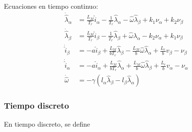 \documentclass{article}
\begin{document}
            Ecuaciones en tiempo continuo:
            \begin{align*}
               \dot{\hat{\lambda}}_\alpha &=  \frac{L_M}{T_r} \hat{i}_\alpha 
                    - \frac{1}{T_r} \hat{\lambda}_\alpha  
                    - \hat{\omega} \hat{\lambda}_\beta 
                    + k_1\nu_\alpha + k_2\nu_\beta  \\
                \dot{\hat{\lambda}}_\beta &=  \frac{L_M}{T_r} \hat{i}_\beta 
                    - \frac{1}{T_r} \hat{\lambda}_\beta  
                    + \hat{\omega} \hat{\lambda}_\alpha 
                    - k_2\nu_\alpha + k_1\nu_\beta  \\
                \dot{\hat{i}}_\beta &=  -a \hat{i}_\beta 
                    + \frac{L_M}{b T_r} \hat{\lambda}_\beta  
                    - \frac{L_M}{b} \hat{\omega} \hat{\lambda}_\alpha 
                    + \frac{L_r}{b} v_\beta 
                    - \nu_\beta \\
                \dot{\hat{i}}_\alpha &=  -a \hat{i}_\alpha 
                    + \frac{L_M}{b T_r} \hat{\lambda}_\alpha  
                    + \frac{L_M}{b} \hat{\omega} \hat{\lambda}_\beta 
                    + \frac{L_r}{b} v_\alpha
                    - \nu_\alpha \\
                \dot{\hat{\omega}} &=  -\gamma \left( l_\alpha \hat{\lambda}_\beta 
                    - l_\beta \hat{\lambda}_\alpha  \right)
            \end{align*}
        


        \subsubsection{Tiempo discreto}
            En tiempo discreto, se define
            
\end{document}
